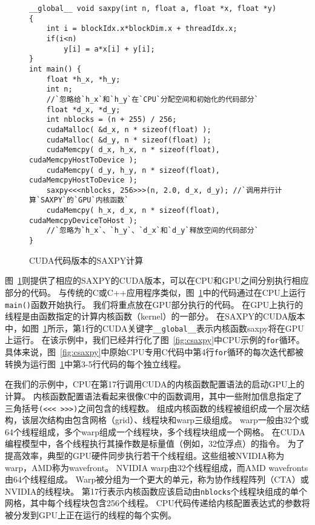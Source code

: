 \begin{figure}[htbp]
\centering
\begin{lstlisting}[language={[ANSI]C}]
__global__ void saxpy(int n, float a, float *x, float *y)
{
    int i = blockIdx.x*blockDim.x + threadIdx.x;
    if(i<n)
        y[i] = a*x[i] + y[i];
}
int main() {
    float *h_x, *h_y;
    int n;
    //`忽略给`h_x`和`h_y`在`CPU`分配空间和初始化的代码部分`
    float *d_x, *d_y;
    int nblocks = (n + 255) / 256;
    cudaMalloc( &d_x, n * sizeof(float) );
    cudaMalloc( &d_y, n * sizeof(float) );
    cudaMemcpy( d_x, h_x, n * sizeof(float), cudaMemcpyHostToDevice );
    cudaMemcpy( d_y, h_y, n * sizeof(float), cudaMemcpyHostToDevice );
    saxpy<<<nblocks, 256>>>(n, 2.0, d_x, d_y); //`调用并行计算`SAXPY`的`GPU`内核函数`
    cudaMemcpy( h_x, d_x, n * sizeof(float), cudaMemcpyDeviceToHost );
    //`忽略为`h_x`、`h_y`、`d_x`和`d_y`释放空间的代码部分`
}
\end{lstlisting} 
\caption{CUDA代码版本的SAXPY计算}
\label{fig:cudasaxpy}
\end{figure}

图~\ref{fig:cudasaxpy}则提供了相应的SAXPY的CUDA版本，可以在CPU和GPU之间分别执行相应部分的代码。
与传统的C或C++应用程序类似，图~\ref{fig:cudasaxpy}中的代码通过在CPU上运行\texttt{main()}函数开始执行。 
我们将重点放在GPU部分执行的代码。
在GPU上执行的线程是由函数指定的计算内核函数（kernel）的一部分。 
在SAXPY的CUDA版本中，如图~\ref{fig:cudasaxpy}所示，第1行的CUDA关键字\texttt{\_\_global\_\_}表示内核函数saxpy将在GPU上运行。 
在该示例中，我们已经并行化了图~\ref{fig:csaxpy}中CPU示例的\texttt{for}循环。 
具体来说，图~\ref{fig:csaxpy}中原始CPU专用C代码中第4行\texttt{for}循环的每次迭代都被转换为运行图~\ref{fig:cudasaxpy}中第3-5行代码的每个独立线程。

在我们的示例中，CPU在第17行调用CUDA的内核函数配置语法的启动GPU上的计算。
内核函数配置语法看起来很像C中的函数调用，其中一些附加信息指定了三角括号\texttt{(<{}<{}< >{}>{}>)}之间包含的线程数。
组成内核函数的线程被组织成一个层次结构，该层次结构由包含网格（grid）、线程块和warp三级组成。
warp一般由32个或64个线程组成，多个warp组成一个线程块，多个线程块组成一个网格。
在CUDA编程模型中，各个线程执行其操作数是标量值（例如，32位浮点）的指令。
为了提高效率，典型的GPU硬件同步执行若干个线程组。这些组被NVIDIA称为warp，AMD称为wavefront。 NVIDIA warp由32个线程组成，而AMD wavefronts由64个线程组成。 
Warp被分组为一个更大的单元，称为协作线程阵列（CTA）或NVIDIA的线程块。
第17行表示内核函数应该启动由\texttt{nblocks}个线程块组成的单个网格，其中每个线程块包含256个线程。
CPU代码传递给内核配置表达式的参数将被分发到GPU上正在运行的线程的每个实例。

